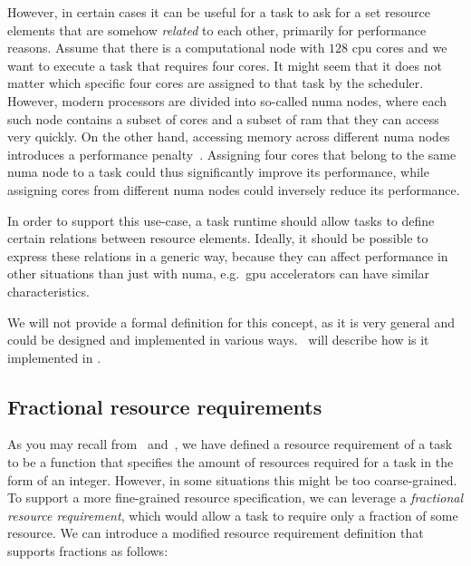 However, in certain cases it can be useful for a task to ask for a set resource elements that are
somehow \emph{related} to each other, primarily for performance reasons. Assume that there
is a computational node with $128$ \gls{cpu} cores and we want to
execute a task that requires four cores. It might seem that it does not matter which specific four
cores are assigned to that task by the scheduler. However, modern processors are divided into
so-called \gls{numa} nodes, where each such node contains a subset of cores and a
subset of \gls{ram} that they can access very quickly. On the other hand, accessing
memory across different \gls{numa} nodes introduces a performance
penalty~\cite{numa_effect}. Assigning four cores that belong to the same
\gls{numa} node to a task could thus significantly improve its performance, while
assigning cores from different \gls{numa} nodes could inversely reduce its
performance.

In order to support this use-case, a task runtime should allow tasks to define certain relations
between resource elements. Ideally, it should be possible to express these relations in a generic
way, because they can affect performance in other situations than just with
\gls{numa}, e.g.\ \gls{gpu} accelerators can have similar
characteristics.

We will not provide a formal definition for this concept, as it is very general and could be
designed and implemented in various ways.~ will describe how is it
implemented in \hyperqueue{}.


\subsection{Fractional resource requirements}
As you may recall from~ and~, we have defined a
resource requirement of a task to be a function that specifies the amount of resources required for
a task in the form of an integer. However, in some situations this might be too coarse-grained. To
support a more fine-grained resource specification, we can leverage a \emph{fractional resource requirement},
which would allow a task to require only a fraction of some resource. We can introduce a modified
resource requirement definition that supports fractions  as follows:



